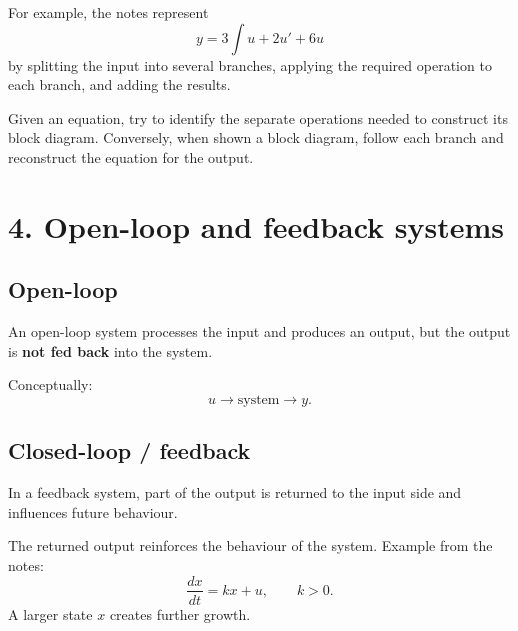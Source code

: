 \documentclass[11pt,a4paper]{article}
\begin{document}
For example, the notes represent
\[
y=3\int u+2u'+6u
\]
by splitting the input into several branches, applying the required operation to each branch, and adding the results.

\begin{exam}
Given an equation, try to identify the separate operations needed to construct its block diagram. Conversely, when shown a block diagram, follow each branch and reconstruct the equation for the output.
\end{exam}

\newpage
\section{4. Open-loop and feedback systems}

\subsection{Open-loop}
An open-loop system processes the input and produces an output, but the output is \textbf{not fed back} into the system.

Conceptually:
\[
u \longrightarrow \boxed{\text{system}} \longrightarrow y.
\]

\subsection{Closed-loop / feedback}
In a feedback system, part of the output is returned to the input side and influences future behaviour.

\begin{center}
\end{center}

\begin{keybox}
The returned output reinforces the behaviour of the system. Example from the notes:
\[
\frac{dx}{dt}=kx+u,\qquad k>0.
\]
A larger state $x$ creates further growth.
\end{keybox}
\end{document}
